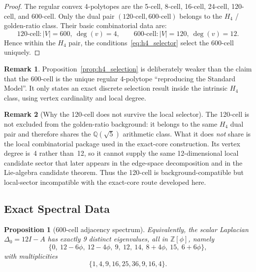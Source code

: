 \documentclass[12pt,a4paper]{article}
\newtheorem{proposition}{Proposition}
\theoremstyle{definition}
\newtheorem{remark}{Remark}
\begin{document}
\begin{proof}
The regular convex 4-polytopes are the 5-cell, 8-cell, 16-cell, 24-cell, 120-cell, and 600-cell.  Only the dual pair $(120\text{-cell},600\text{-cell})$ belongs to the $H_4$ / golden-ratio class.  Their basic combinatorial data are:
\[
120\text{-cell}: |V|=600,\ \deg(v)=4,
\qquad
600\text{-cell}: |V|=120,\ \deg(v)=12.
\]
Hence within the $H_4$ pair, the conditions~\eqref{eq:h4_selector} select the 600-cell uniquely.
\end{proof}

\begin{remark}
Proposition~\ref{prop:h4_selection} is deliberately weaker than the claim that the 600-cell is the unique regular 4-polytope ``reproducing the Standard Model''.  It only states an exact discrete selection result inside the intrinsic $H_4$ class, using vertex cardinality and local degree.
\end{remark}

\begin{remark}[Why the 120-cell does not survive the local selector]
\label{rem:120cell}
The 120-cell is not excluded from the golden-ratio background: it belongs to the same $H_4$ dual pair and therefore shares the $\mathbb{Q}(\sqrt{5})$ arithmetic class.  What it does \emph{not} share is the local combinatorial package used in the exact-core construction.  Its vertex degree is~4 rather than~12, so it cannot supply the same 12-dimensional local candidate sector that later appears in the edge-space decomposition and in the Lie-algebra candidate theorem.  Thus the 120-cell is background-compatible but local-sector incompatible with the exact-core route developed here.
\end{remark}

\subsection{Exact Spectral Data}

\begin{proposition}[600-cell adjacency spectrum]
\label{prop:spectrum_exact}
Equivalently, the scalar Laplacian $\Delta_0=12I-A$ has exactly 9 distinct
eigenvalues, all in $\mathbb{Z}[\phi]$, namely
\begin{equation}
\{0,\ 12-6\phi,\ 12-4\phi,\ 9,\ 12,\ 14,\ 8+4\phi,\ 15,\ 6+6\phi\},
\end{equation}
with multiplicities
\begin{equation}
\{1,4,9,16,25,36,9,16,4\}.
\end{equation}
\end{proposition}
\end{document}
